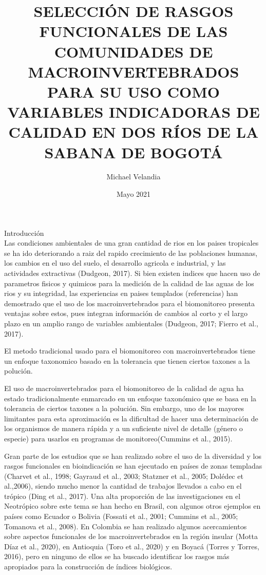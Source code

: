 \documentclass[12pt, letterpaper]{article}
\title{SELECCIÓN DE RASGOS FUNCIONALES DE LAS COMUNIDADES DE MACROINVERTEBRADOS PARA SU USO COMO
VARIABLES INDICADORAS DE CALIDAD EN DOS RÍOS DE LA SABANA DE BOGOTÁ}
\author{Michael Velandia}
\date{Mayo 2021}
\begin{document}
\maketitle

Introducción\\


Las condiciones ambientales de una gran cantidad de rios en los paises tropicales
se ha ido deteriorando a raiz del  rapido crecimiento de las poblaciones humanas,
los cambios en el uso del suelo, el desarrollo agricola e industrial, y las 
actividades extractivas (Dudgeon, 2017). Si bien existen indices que hacen uso 
de parametros fisicos y quimicos para la medición de la calidad de las aguas 
de los rios y su integridad, las experiencias en paises templados (referencias)
han demostrado que el uso de los macroinvertebrados para el biomonitoreo 
presenta ventajas sobre estos, pues integran información de cambios al corto y el 
largo plazo  en un amplio rango de variables ambientales (Dudgeon, 2017; 
Fierro et al., 2017).  

El metodo tradicional usado para el biomonitoreo con macroinvertebrados tiene 
un enfoque taxonomico basado en la tolerancia que tienen ciertos taxones a la
polución.


El uso de macroinvertebrados para el biomonitoreo de la calidad de agua ha 
estado tradicionalmente enmarcado en un enfoque taxonómico que se basa en
la tolerancia de ciertos taxones a la polución. Sin embargo, uno de los mayores
limitantes para esta aproximación es la dificultad de hacer una determinación
de los organismos de manera rápida y a un suficiente nivel de detalle (género
o especie) para usarlos en programas de monitoreo(Cummins et al., 2015).


Gran parte de los estudios que se han realizado sobre el uso de la diversidad 
y los rasgos funcionales en bioindicación se han ejecutado en países de zonas
templadas (Charvet et al., 1998; Gayraud et al., 2003; Statzner et al., 2005;
Dolédec et al.,2006), siendo mucho menor la cantidad de trabajos llevados a 
cabo en el trópico (Ding et al., 2017). Una alta proporción de las 
investigaciones en el Neotrópico sobre este tema se han hecho en Brasil, con
algunos otros ejemplos en países como Ecuador o Bolivia (Fossati et al., 2001;
Cummins et al., 2005; Tomanova et al., 2008). En Colombia se han realizado 
algunos acercamientos sobre aspectos funcionales de los macroinvertebrados en
la región insular (Motta Díaz et al., 2020), en Antioquia (Toro et al., 2020)
y en Boyacá (Torres y Torres, 2016), pero en ninguno de ellos se ha buscado
identificar los rasgos más apropiados para la construcción de índices biológicos.
\end{document}
